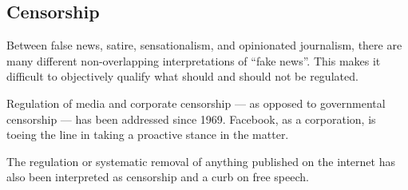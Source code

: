 \subsection{Censorship}

\par Between false news, satire, sensationalism, and opinionated journalism, there are many different non-overlapping interpretations of ``fake news''. \cite{npr_fake_news} This makes it difficult to objectively qualify what should and should not be regulated.

\par Regulation of media and corporate censorship --- as opposed to governmental censorship --- has been addressed since 1969. \cite{silent_screen} Facebook, as a corporation, is toeing the line in taking a proactive stance in the matter.

\par The regulation or systematic removal of anything published on the internet has also been interpreted as censorship and a curb on free speech. \cite{eff_cali_bill_distrastrous}

\vfill